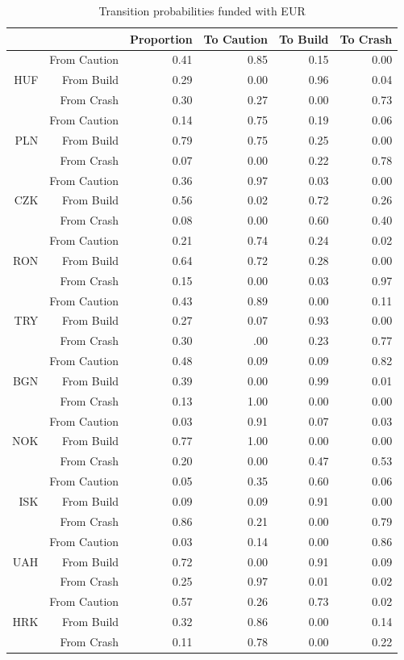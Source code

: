 \documentclass[12pt, a4paper, oneside]{article} %
\begin{document}
\begin{table}[!h]
\centering
\begin{tabular}{rrrrrr}
  \hline
 & & Proportion & To Caution & To Build & To Crash \\ 
  \hline
\multirow{3}{*}{HUF} & From Caution & 0.41 & 0.85 & 0.15 & 0.00  \\ 
   & From Build & 0.29  & 0.00 & 0.96 & 0.04 \\ 
   & From Crash & 0.30 & 0.27 & 0.00 & 0.73 \\ 
\hline
\multirow{3}{*}{PLN} & From Caution & 0.14 & 0.75 & 0.19 & 0.06 \\ 
   & From Build & 0.79 & 0.75 & 0.25 & 0.00 \\ 
   & From Crash & 0.07 & 0.00 & 0.22 & 0.78 \\ 
\hline
\multirow{3}{*}{CZK}  & From Caution & 0.36 & 0.97 & 0.03 & 0.00 \\ 
   & From Build & 0.56 & 0.02 & 0.72 & 0.26 \\ 
   & From Crash & 0.08 & 0.00 & 0.60 & 0.40 \\ 
\hline
\multirow{3}{*}{RON}& From Caution & 0.21 & 0.74 & 0.24 & 0.02 \\ 
   & From Build & 0.64 & 0.72 & 0.28 & 0.00 \\ 
   & From Crash & 0.15 & 0.00 & 0.03 & 0.97 \\ 
\hline
\multirow{3}{*}{TRY}  & From Caution & 0.43 & 0.89 & 0.00 & 0.11 \\ 
   & From Build & 0.27 & 0.07 & 0.93 & 0.00 \\ 
   & From Crash & 0.30 & .00 & 0.23 & 0.77 \\ 
\hline
\multirow{3}{*}{BGN}  & From Caution & 0.48 & 0.09 & 0.09 & 0.82 \\ 
   & From Build & 0.39 & 0.00 & 0.99 & 0.01 \\ 
   & From Crash & 0.13 & 1.00 & 0.00 & 0.00 \\ 
\hline
\multirow{3}{*}{NOK}  & From Caution & 0.03 & 0.91 & 0.07 & 0.03 \\ 
   & From Build & 0.77 & 1.00 & 0.00 & 0.00 \\ 
  & From Crash & 0.20 & 0.00 & 0.47 & 0.53 \\ 
\hline
\multirow{3}{*}{ISK}   & From Caution & 0.05 & 0.35 & 0.60 & 0.06 \\ 
   & From Build & 0.09 & 0.09 & 0.91 & 0.00 \\ 
   & From Crash & 0.86 & 0.21 & 0.00 & 0.79 \\ 
\hline
\multirow{3}{*}{UAH} & From Caution & 0.03 & 0.14 & 0.00 & 0.86 \\ 
   & From Build & 0.72 & 0.00 & 0.91 & 0.09 \\ 
   & From Crash & 0.25 & 0.97 & 0.01 & 0.02 \\ 
\hline
\multirow{3}{*}{HRK}  & From Caution & 0.57 & 0.26 & 0.73 & 0.02 \\ 
   & From Build  & 0.32 & 0.86 & 0.00 & 0.14 \\ 
   & From Crash & 0.11 & 0.78 & 0.00 & 0.22 \\ 
   \hline
\end{tabular}
\caption{Transition probabilities funded with EUR}
\label{tabref:3StateTrans}
\end{table}
\end{document}
